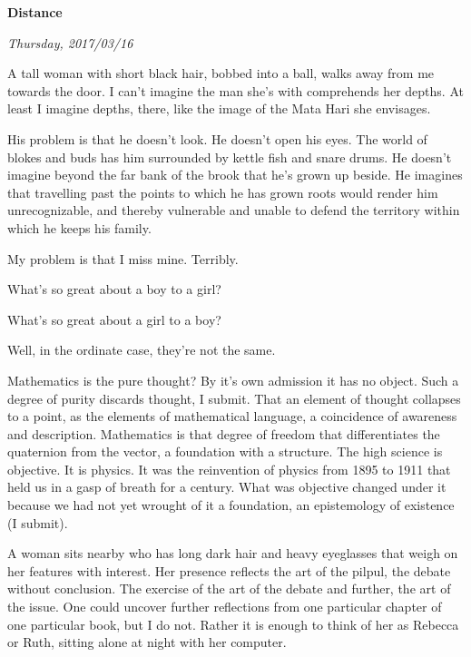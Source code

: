 

\centerline{\bf Distance}
\centerline{\it Thursday, 2017/03/16}



\vfill
\break


A tall woman with short black hair, bobbed into a ball, walks away
from me towards the door.  I can't imagine the man she's with
comprehends her depths.  At least I imagine depths, there, like the
image of the Mata Hari she envisages.

His problem is that he doesn't look.  He doesn't open his eyes.  The
world of blokes and buds has him surrounded by kettle fish and snare
drums.  He doesn't imagine beyond the far bank of the brook that he's
grown up beside.  He imagines that travelling past the points to which
he has grown roots would render him unrecognizable, and thereby
vulnerable and unable to defend the territory within which he keeps
his family.

My problem is that I miss mine.  Terribly.


\vfill
\break

What's so great about a boy to a girl?

What's so great about a girl to a boy?

Well, in the ordinate case, they're not the same.



\vfill
\break


Mathematics is the pure thought?  By it's own admission it has no
object.  Such a degree of purity discards thought, I submit.  That an
element of thought collapses to a point, as the elements of
mathematical language, a coincidence of awareness and description.
Mathematics is that degree of freedom that differentiates the
quaternion from the vector, a foundation with a structure.  The high
science is objective.  It is physics.  It was the reinvention of
physics from 1895 to 1911 that held us in a gasp of breath for a
century.  What was objective changed under it because we had not yet
wrought of it a foundation, an epistemology of existence (I submit).


\vfill
\break

A woman sits nearby who has long dark hair and heavy eyeglasses that
weigh on her features with interest.  Her presence reflects the art of
the pilpul, the debate without conclusion.  The exercise of the art of
the debate and further, the art of the issue.  One could uncover
further reflections from one particular chapter of one particular
book, but I do not.  Rather it is enough to think of her as Rebecca or
Ruth, sitting alone at night with her computer.


